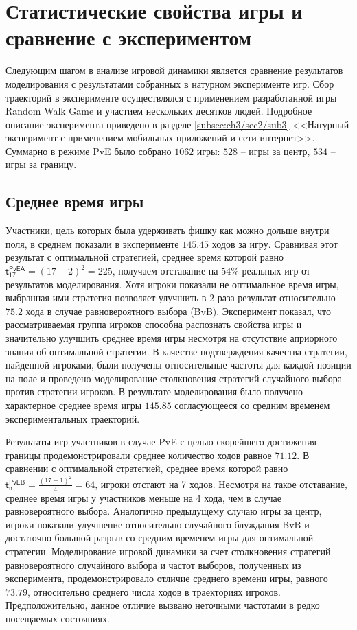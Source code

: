 \section{Статистические свойства игры и сравнение с экспериментом}\label{sec:ch3/sec4}

Следующим шагом в анализе игровой динамики является сравнение результатов моделирования с результатами собранных в натурном эксперименте игр. Сбор траекторий в эксперименте осуществлялся с применением разработанной игры Random Walk Game и участием нескольких десятков людей. Подробное описание эксперимента приведено в разделе \cref{subsec:ch3/sec2/sub3} <<Натурный эксперимент с применением мобильных приложений и сети интернет>>. Суммарно в режиме PvE было собрано $1062$ игры: $528$ -- игры за центр, $534$ -- игры за границу. 

\subsection{Среднее время игры}\label{subsec:ch3/sec4/sub1}

Участники, цель которых была удерживать фишку как можно дольше внутри поля, в среднем показали в эксперименте $145.45$ ходов за игру. Сравнивая этот результат с оптимальной стратегией, среднее время которой равно $\boldsymbol{\mathsf{t_{17}^{PvE A}}} = (17-2)^2 = 225$, получаем отставание на $54\%$ реальных игр от результатов моделирования. Хотя игроки показали не оптимальное время игры, выбранная ими стратегия позволяет улучшить в $2$ раза результат относительно $75.2$ хода в случае равновероятного выбора (BvB). Эксперимент показал, что рассматриваемая группа игроков способна распознать свойства игры и значительно улучшить среднее время игры несмотря на отсутствие априорного знания об оптимальной стратегии. В качестве подтверждения качества стратегии, найденной игроками, были получены относительные частоты для каждой позиции на поле и проведено моделирование столкновения стратегий случайного выбора против стратегии игроков. В результате моделирования было получено характерное среднее время игры $145.85$ согласующееся со средним временем экспериментальных траекторий.

Результаты игр участников в случае PvE с целью скорейшего достижения границы продемонстрировали среднее количество ходов равное $71.12$. В сравнении с оптимальной стратегией, среднее время которой равно $\boldsymbol{\mathsf{t_n^{PvE B}}} = \frac{(17-1)^2}{4} = 64$, игроки отстают на 7 ходов. Несмотря на такое отставание, среднее время игры у участников меньше на 4 хода, чем в случае равновероятного выбора. Аналогично предыдущему случаю игры за центр, игроки показали улучшение относительно случайного блуждания BvB и достаточно большой разрыв со средним временем игры для оптимальной стратегии. Моделирование игровой динамики за счет столкновения стратегий равновероятного случайного выбора и частот выборов, полученных из эксперимента, продемонстрировало отличие среднего времени игры, равного $73.79$, относительно среднего числа ходов в траекториях игроков. Предположительно, данное отличие вызвано неточными частотами в редко посещаемых состояниях. 

